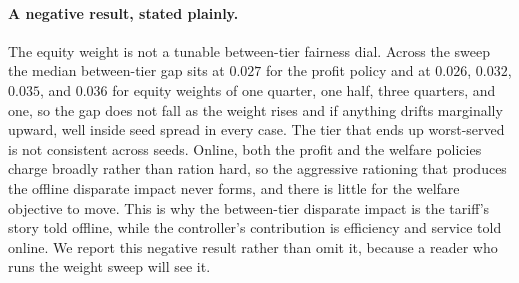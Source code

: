 \documentclass[manuscript, screen, review, anonymous]{acmart}
\begin{document}
\paragraph{A negative result, stated plainly.}
The equity weight is not a tunable between-tier fairness dial. Across the sweep the median between-tier gap sits at $0.027$ for the profit policy and at $0.026$, $0.032$, $0.035$, and $0.036$ for equity weights of one quarter, one half, three quarters, and one, so the gap does not fall as the weight rises and if anything drifts marginally upward, well inside seed spread in every case. The tier that ends up worst-served is not consistent across seeds. Online, both the profit and the welfare policies charge broadly rather than ration hard, so the aggressive rationing that produces the offline disparate impact never forms, and there is little for the welfare objective to move. This is why the between-tier disparate impact is the tariff's story told offline, while the controller's contribution is efficiency and service told online. We report this negative result rather than omit it, because a reader who runs the weight sweep will see it.

\end{document}
